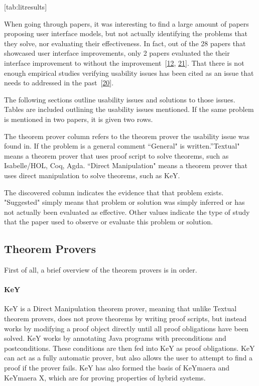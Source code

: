 \documentclass[
]{article}
\begin{document}
\protect\hypertarget{tab:litresults}{}{{[}tab:litresults{]}}

When going through papers, it was interesting to find a large amount of
papers proposing user interface models, but not actually identifying the
problems that they solve, nor evaluating their effectiveness. In fact,
out of the 28 papers that showcased user interface improvements, only 2
papers evaluated the their interface improvement to without the
improvement~{[}\protect\hyperlink{ref-berman_development_2014}{12},
\protect\hyperlink{ref-hentschel_empirical_2016}{21}{]}. That there is
not enough empirical studies verifying usability issues has been cited
as an issue that needs to addressed in the
past~{[}\protect\hyperlink{ref-hahnle_deductive_2019}{20}{]}.

The following sections outline usability issues and solutions to those
issues. Tables are included outlining the usability issues mentioned. If
the same problem is mentioned in two papers, it is given two rows.

The theorem prover column refers to the theorem prover the usability
issue was found in. If the problem is a general comment ``General" is
written.''Textual" means a theorem prover that uses proof script to
solve theorems, such as Isabelle/HOL, Coq, Agda. ``Direct Manipulation"
means a theorem prover that uses direct manipulation to solve theorems,
such as KeY.

The discovered column indicates the evidence that that problem exists.
"Suggested" simply means that problem or solution was simply inferred or
has not actually been evaluated as effective. Other values indicate the
type of study that the paper used to observe or evaluate this problem or
solution.

\hypertarget{theorem-provers}{%
\subsection{Theorem Provers}\label{theorem-provers}}

First of all, a brief overview of the theorem provers is in order.

\hypertarget{key}{%
\paragraph{KeY}\label{key}}

KeY is a Direct Manipulation theorem prover, meaning that unlike Textual
theorem provers, does not prove theorems by writing proof scripts, but
instead works by modifying a proof object directly until all proof
obligations have been solved. KeY works by annotating Java programs with
preconditions and postconditions. These conditions are then fed into KeY
as proof obligations. KeY can act as a fully automatic prover, but also
allows the user to attempt to find a proof if the prover fails. KeY has
also formed the basis of KeYmaera and KeYmaera X, which are for proving
properties of hybrid systems.
\end{document}
